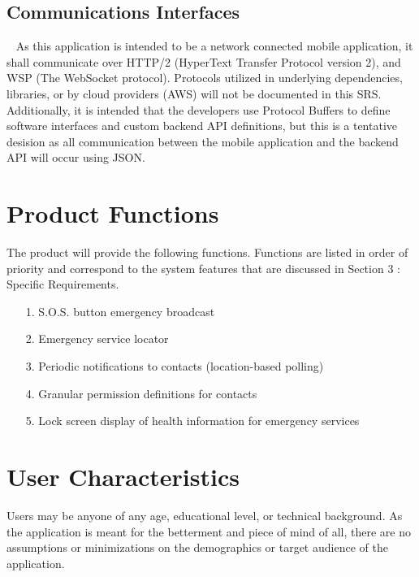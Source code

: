 \documentclass{scrreprt}
\begin{document}
\subsection{Communications Interfaces}
\par ~ As this application is intended to be a network connected mobile application, it shall communicate over HTTP/2 (HyperText Transfer Protocol version 2), and WSP (The WebSocket protocol). Protocols utilized in underlying dependencies, libraries, or by cloud providers (AWS) will not be documented in this SRS. Additionally, it is intended that the developers use Protocol Buffers to define software interfaces and custom backend API definitions, but this is a tentative desision as all communication between the mobile application and the backend API will occur using JSON.


\section{Product Functions}
The product will provide the following functions. Functions are listed in order of priority and correspond to the system features that are discussed in Section 3 : Specific Requirements. \begin{enumerate}
	\item[1.] S.O.S. button emergency broadcast
	\item[2.] Emergency service locator
	\item[3.] Periodic notifications to contacts (location-based polling)
	\item[4.] Granular permission definitions for contacts
	\item[5.] Lock screen display of health information for emergency services
\end{enumerate}


\section{User Characteristics}
Users may be anyone of any age, educational level, or technical background. As the application is meant for the betterment and piece of mind of all, there are no assumptions or minimizations on the demographics or target audience of the application.
\end{document}
